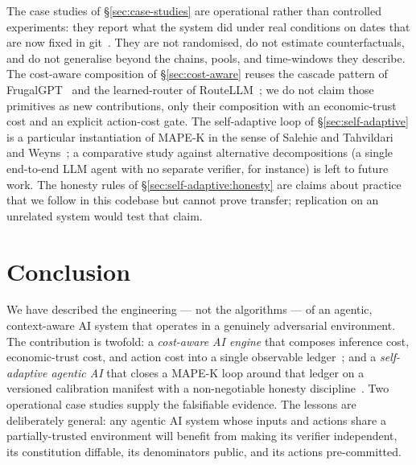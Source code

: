 \documentclass[11pt,a4paper]{article}
\begin{document}
The case studies of \S\ref{sec:case-studies} are operational rather than
controlled experiments: they report what the system did under real
conditions on dates that are now fixed in
git~\cite{omnirisk2026soak,omnirisk2026predmetrics}. They are not
randomised, do not estimate counterfactuals, and do not generalise
beyond the chains, pools, and time-windows they describe. The
cost-aware composition of \S\ref{sec:cost-aware} reuses the cascade
pattern of FrugalGPT~\cite{chen2023frugalgpt} and the learned-router of
RouteLLM~\cite{ong2024routellm}; we do not claim those primitives as new
contributions, only their composition with an economic-trust cost and an
explicit action-cost gate. The self-adaptive loop of
\S\ref{sec:self-adaptive} is a particular instantiation of MAPE-K in the
sense of Salehie and Tahvildari~\cite{salehie2009self} and
Weyns~\cite{weyns2020introduction}; a comparative study against
alternative decompositions (a single end-to-end LLM agent with no
separate verifier, for instance) is left to future work. The honesty
rules of \S\ref{sec:self-adaptive:honesty} are claims about practice
that we follow in this codebase but cannot prove transfer; replication
on an unrelated system would test that claim.

\section{Conclusion}\label{sec:conclusion}

We have described the engineering --- not the algorithms --- of an
agentic, context-aware AI system that operates in a genuinely
adversarial environment. The contribution is twofold: a \emph{cost-aware
AI engine} that composes inference cost, economic-trust cost, and
action cost into a single observable
ledger~\cite{chen2023frugalgpt,ong2024routellm,rao2021bittensor}; and a
\emph{self-adaptive agentic AI} that closes a MAPE-K loop around that
ledger on a versioned calibration manifest with a non-negotiable
honesty discipline~\cite{salehie2009self,weyns2020introduction,wang2024survey,bai2022constitutional}.
Two operational case studies supply the falsifiable evidence. The
lessons are deliberately general: any agentic AI system whose inputs and
actions share a partially-trusted environment will benefit from making
its verifier independent, its constitution diffable, its denominators
public, and its actions pre-committed.

\printbibliography
\end{document}

